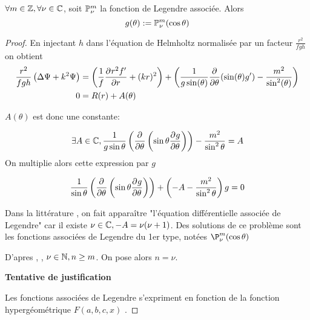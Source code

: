 \begin{prop}$\forall m \in \ZZ, \forall \nu \in \CC$, soit $\PP^m_\nu$ la fonction de Legendre associée. Alors
  \begin{equation} 
    g(\theta) := \PP^m_\nu(\cos \theta)
  \end{equation}
\end{prop}
\begin{proof}

En injectant $h$ dans l'équation de Helmholtz normalisée par un facteur $\frac{r^2}{fgh}$ on obtient
\begin{align*}
     \frac{r^2}{fgh} \left(\Delta \Psi + k^2 \Psi\right) &= 
     \left(\frac{1}{f}\ddr{r}{r^2f'} + (kr)^2\right) + 
     \left(\frac{1}{g\sin(\theta)} \ddr{\theta}{}(\sin(\theta)g') -  \frac{m^2}{\sin^2(\theta)}\right) \\
 0 &= R(r) + A(\theta)
\end{align*}

$A(\theta)$ est donc une constante:

\[
 \exists A \in \CC, \frac{1}{g\sin\theta}\left(\ddr{\theta}{}\left(\sin\theta\ddr{\theta}{g}\right)\right)  -\frac{m^2}{\sin^2\theta} = A
\]
  On multiplie alors cette expression par $g$

  \begin{equation*}
    \label{eq:helm:legendre}\frac{1}{\sin\theta}\left(\ddr{\theta}{}\left(\sin\theta\ddr{\theta}{g}\right)\right) + \left(- A -\frac{m^2}{\sin^2\theta}\right)g = 0
  \end{equation*}

Dans la littérature \cite{abramowitz_handbook_1964}, on fait apparaître "l'équation différentielle associée de Legendre" car il existe $
\nu \in \CC,-A = \nu(\nu + 1)$. Des solutions de ce problème sont les fonctions associées de Legendre du 1er type, notées $\P^m_\nu(\cos \theta)$ 

D'apres \cite[p.~1264]{abramowitz_handbook_1964}, \cite[p.~84]{bohren_absorption_2004}, $\nu \in \NN, n\ge m $. On pose alors $n = \nu$.


{ \color{red}
\textbf{Tentative de justification}

Les fonctions associées de Legendre s'expriment en fonction de la fonction hypergéométrique $F(a,b,c,x)$ \cite[p.~332]{abramowitz_handbook_1964}.

}
\end{proof}
